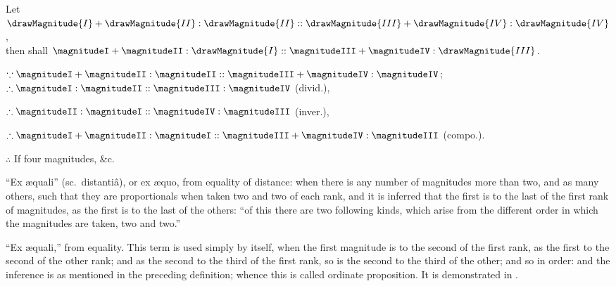 \documentclass[booklanguage=english]{byrnebook}
\begin{document}
\begin{center}
Let $ \drawMagnitude{I} + \drawMagnitude{II} : \drawMagnitude{II} ::  \drawMagnitude{III} + \drawMagnitude{IV} : \drawMagnitude{IV}$,\\
then shall $\magnitudeI + \magnitudeII : \drawMagnitude{I} :: \magnitudeIII + \magnitudeIV : \drawMagnitude{III}$.

$\because \magnitudeI + \magnitudeII : \magnitudeII :: \magnitudeIII + \magnitudeIV : \magnitudeIV$;\\ %
$\therefore \magnitudeI : \magnitudeII :: \magnitudeIII : \magnitudeIV$ (divid.), %

$\therefore \magnitudeII : \magnitudeI :: \magnitudeIV : \magnitudeIII$ (inver.),

$\therefore \magnitudeI + \magnitudeII : \magnitudeI :: \magnitudeIII + \magnitudeIV : \magnitudeIII$ (compo.).

$\therefore$ If four magnitudes, \&c.
\end{center}

\label{def:V.XVIII} 
\enquote{Ex \ae quali} (sc.\ distantiâ), or ex \ae quo, from equality of distance: when there is any number of magnitudes more than two, and as many others, such that they are proportionals when taken two and two of each rank, and it is inferred that the first is to the last of the first rank of magnitudes, as the first is to the last of the others: \enquote{of this there are two following kinds, which arise from the different order in which the magnitudes are taken, two and two.}

\vfill\pagebreak

\label{def:V.XIX} 
\def\varA{\textcolor{byred}{A}}
\def\varB{\textcolor{byred}{B}}
\def\varC{\textcolor{byyellow}{C}}
\def\varD{\textcolor{byyellow}{D}}
\def\varE{\textcolor{byblue}{E}}
\def\varF{\textcolor{byblue}{F}}
\def\varL{\textcolor{byred}{L}}
\def\varM{\textcolor{byred}{M}}
\def\varN{\textcolor{byyellow}{N}}
\def\varO{\textcolor{byyellow}{O}}
\def\varP{\textcolor{byblue}{P}}
\def\varQ{\textcolor{byblue}{Q}}
\enquote{Ex \ae quali,} from equality. This term is used simply by itself, when the first magnitude is to the second of the first rank, as the first to the second of the other rank; and as the second to the third of the first rank, so is the second to the third of the other; and so in order: and the inference is as mentioned in the preceding definition; whence this is called ordinate proposition. It is demonstrated in .
\end{document}
